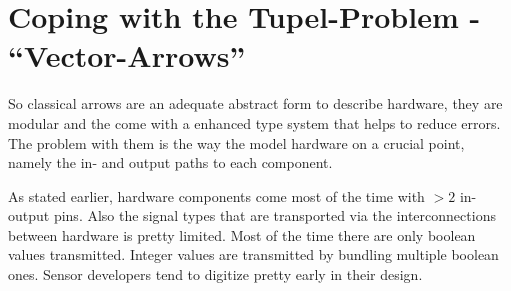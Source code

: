 \documentclass[9pt,final,a4paper,leqno]{article}
\begin{document}
%
%
%
%
%
%


\section{Coping with the Tupel-Problem - ``Vector-Arrows''}
So classical arrows are an adequate abstract form to describe hardware, they are modular and the come with a enhanced type system that
helps to reduce errors. The problem with them is the way the model hardware on a crucial point, namely the in- and output paths to each
component. 

\par
As stated earlier, hardware components come most of the time with $>2$ in- output pins. Also the signal types that are transported via the
interconnections between hardware is pretty limited. Most of the time there are only boolean values transmitted. Integer values are
transmitted by bundling multiple boolean ones. Sensor developers tend to digitize pretty early in their design. \cite{MakinwaSmatSensors}
\end{document}
